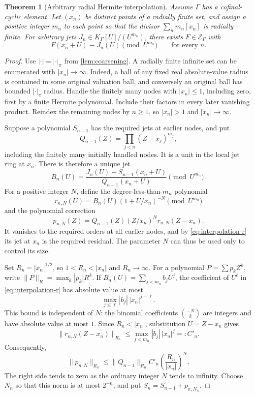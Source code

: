 \documentclass[11pt]{article}
\newtheorem{theorem}{Theorem}[section]
\theoremstyle{plain}
\theoremstyle{plain}
\theoremstyle{plain}
\theoremstyle{definition}
\theoremstyle{definition}
\theoremstyle{definition}
\theoremstyle{remark}
\newcommand{\K}{K_\Gamma}\newcommand{\E}{\mathcal E_\Gamma}
\begin{document}
\begin{theorem}[Arbitrary radial Hermite interpolation]
\label{thm:interpolation}
Assume $\Gamma$ has a cofinal-cyclic element. Let $(x_n)$ be distinct
points of a radially finite set, and assign a positive integer $m_n$
to each point so that the divisor $\sum_nm_n[x_n]$ is radially finite.
For arbitrary jets $J_n\in\K[U]/(U^{m_n})$, there exists $F\in\E$
with
\[
 F(x_n+U)\equiv J_n(U)\pmod{U^{m_n}}
 \qquad\text{for every }n.
\]
\end{theorem}
\begin{proof}
Use $|\cdot|=|\cdot|_\pi$ from \cref{lem:coarsening}. A radially
finite infinite set can be enumerated with $|x_n|\to\infty$.
Indeed, a ball of any fixed real absolute-value radius is contained
in some original valuation ball, and conversely an original ball
has bounded $|\cdot|_\pi$ radius. Handle the finitely many nodes with
$|x_n|\le1$, including zero, first by a finite Hermite polynomial.
Include their factors in every later vanishing product. Reindex the
remaining nodes by $n\ge1$, so $|x_n|>1$ and $|x_n|\to\infty$.

Suppose a polynomial $S_{n-1}$ has the required jets at earlier nodes,
and put
\[
 Q_{n-1}(Z)=\prod_{j<n}(Z-x_j)^{m_j},
\]
including the finitely many initially handled nodes. It is a unit
in the local jet ring at $x_n$. There is therefore a unique jet
\[
 B_n(U)=\frac{J_n(U)-S_{n-1}(x_n+U)}{Q_{n-1}(x_n+U)}
              \pmod{U^{m_n}}.
\]
For a positive integer $N$, define the degree-less-than-$m_n$
polynomial
\begin{equation}\label{eq:interpolation-r}
 r_{n,N}(U)=B_n(U)(1+U/x_n)^{-N}\pmod{U^{m_n}}
\end{equation}
and the polynomial correction
\begin{equation}\label{eq:interpolation-p}
 p_{n,N}(Z)=Q_{n-1}(Z)(Z/x_n)^N r_{n,N}(Z-x_n).
\end{equation}
It vanishes to the required orders at all earlier nodes, and by
\eqref{eq:interpolation-r} its jet at $x_n$ is the required residual.
The parameter $N$ can thus be used only to control its size.

Set $R_n=|x_n|^{1/2}$, so $1<R_n<|x_n|$ and $R_n\to\infty$.
For a polynomial $P=\sum p_kZ^k$, write
$\|P\|_R=\max_k|p_k|R^k$. If $B_n(U)=\sum_{j<m_n}b_jU^j$, the
coefficient of $U^\ell$ in \eqref{eq:interpolation-r} has absolute
value at most
\[
 \max_{j\le\ell}|b_j|\,|x_n|^{j-\ell}.
\]
This bound is independent of $N$: the binomial coefficients
$\binom{-N}{k}$ are integers and have absolute value at most $1$.
Since $R_n<|x_n|$, substitution $U=Z-x_n$ gives
\[
 \|r_{n,N}(Z-x_n)\|_{R_n}
 \le\max_{j<m_n}|b_j|\,|x_n|^j=:C'_n.
\]
Consequently,
\begin{equation}\label{eq:damping}
 \|p_{n,N}\|_{R_n}
 \le \|Q_{n-1}\|_{R_n} C'_n
          \left(\frac{R_n}{|x_n|}\right)^N.
\end{equation}
The right side tends to zero as the ordinary integer $N$ tends to
infinity. Choose $N_n$ so that this norm is at most $2^{-n}$, and put
$S_n=S_{n-1}+p_{n,N_n}$.


\end{proof}
\end{document}
